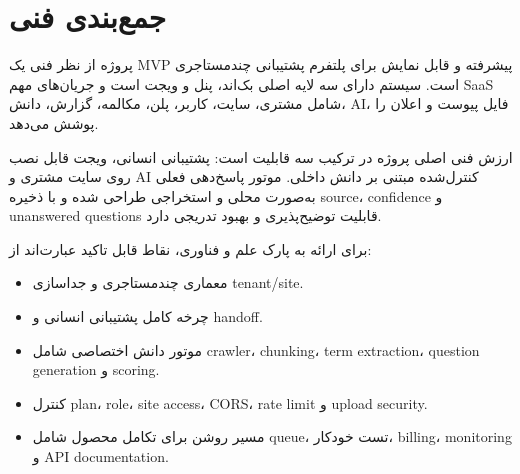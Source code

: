\documentclass[12pt,a4paper]{article}
\newcommand{\en}[1]{\lr{#1}}
\begin{document}
\section{جمع‌بندی فنی}
پروژه \en{AI Chat SaaS} از نظر فنی یک MVP پیشرفته و قابل نمایش برای پلتفرم پشتیبانی چندمستاجری است. سیستم دارای سه لایه اصلی بک‌اند، پنل و ویجت است و جریان‌های مهم SaaS شامل مشتری، سایت، کاربر، پلن، مکالمه، گزارش، دانش، AI، فایل پیوست و اعلان را پوشش می‌دهد.

ارزش فنی اصلی پروژه در ترکیب سه قابلیت است: پشتیبانی انسانی، ویجت قابل نصب روی سایت مشتری و AI کنترل‌شده مبتنی بر دانش داخلی. موتور پاسخ‌دهی فعلی به‌صورت محلی و استخراجی طراحی شده و با ذخیره source، confidence و unanswered questions قابلیت توضیح‌پذیری و بهبود تدریجی دارد.

برای ارائه به پارک علم و فناوری، نقاط قابل تاکید عبارت‌اند از:
\begin{itemize}
  \item معماری چندمستاجری و جداسازی tenant/site.
  \item چرخه کامل پشتیبانی انسانی و handoff.
  \item موتور دانش اختصاصی شامل crawler، chunking، term extraction، question generation و scoring.
  \item کنترل plan، role، site access، CORS، rate limit و upload security.
  \item مسیر روشن برای تکامل محصول شامل queue، تست خودکار، billing، monitoring و API documentation.
\end{itemize}
\end{document}
